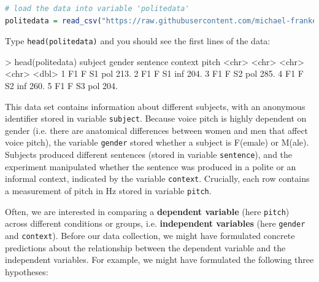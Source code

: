 \documentclass[nobib]{tufte-handout}
\newcommand{\ri}[1]{\lstinline{#1}}  %
\begin{document}
\begin{minipage}[]{\textwidth}
\begin{lstlisting}[language=R]
# load the data into variable 'politedata'
politedata = read_csv("https://raw.githubusercontent.com/michael-franke/bayes_mixed_regression_tutorial/master/code/politeness_data.csv")
\end{lstlisting}
\end{minipage}

\vspace*{-0.5cm}

\noindent Type \ri{head(politedata)} and you should see the first lines of the
data:
%

\bigskip

\begin{minipage}[]{\textwidth}
\begin{rc}
> head(politedata)
   subject gender sentence context pitch
   <chr>   <chr>  <chr>    <chr>   <dbl>
 1 F1      F      S1       pol      213.
 2 F1      F      S1       inf      204.
 3 F1      F      S2       pol      285.
 4 F1      F      S2       inf      260.
 5 F1      F      S3       pol      204.
\end{rc}
\end{minipage}


\medskip

\noindent This data set contains information about different subjects, with an anonymous identifier stored in variable \texttt{subject}.
Because voice pitch is highly dependent on gender (i.e. there are anatomical differences
between women and men that affect voice pitch), the variable \texttt{gender} stored whether a subject is F(emale) or M(ale).
Subjects produced different sentences (stored in variable \texttt{sentence}), and the experiment manipulated whether the sentence was produced in a polite or an informal context, indicated by the variable \texttt{context}. Crucially, each row contains a measurement of pitch in Hz stored in variable \texttt{pitch}.

Often, we are interested in comparing a \textbf{dependent variable} (here \texttt{pitch})
across different conditions or groups, i.e. \textbf{independent variables} (here \texttt{gender} and \texttt{context}). Before our data collection,
we might have formulated concrete predictions about the relationship between the dependent
variable and the independent variables. For example, we might have formulated the following three
hypotheses:
\end{document}
